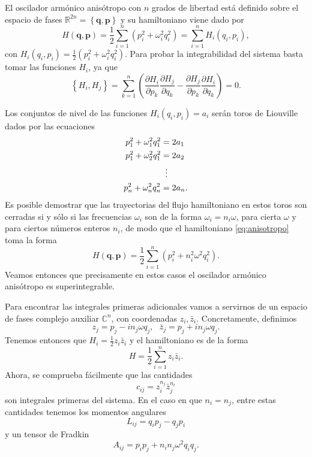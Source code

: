 \documentclass[11pt,a4paper,twoside]{article}
\theoremstyle{definition} \newtheorem{defn}[thm]{Definición}
\theoremstyle{definition} \newtheorem{ejemplo}[thm]{Ejemplo}
\theoremstyle{definition} \newtheorem{ejercicio}[thm]{Ejercicio}
\theoremstyle{remark} \newtheorem*{obs}{Observación}
\def\CC{\mathbb{C}}
\def\RR{\mathbb{R}}
\newcommand{\vect}[1]{\mathbf{#1}}
\newcommand{\parcial}[2]{\frac{\partial #1}{\partial #2}}
\begin{document}
El oscilador armónico anisótropo con $n$ grados de libertad está definido sobre el espacio de fases $\RR^{2n}=\left\{ \vect{q},\vect{p} \right\}$ y su hamiltoniano viene dado por
\begin{equation}
  H(\vect{q},\vect{p})=\frac{1}{2}\sum_{i=1}^n \left(p_i^2 + \omega_i^2q_i^2\right)=\sum_{i=1}^n H_i(q_i,p_i),
  \label{eq:anisotropo}
\end{equation}
con $H_i(q_i,p_i)=\frac{1}{2}(p_i^2+\omega_i^2q_i^2)$. Para probar la integrabilidad del sistema basta tomar las funciones $H_i$, ya que
\begin{equation*}
  \left\{ H_i,H_j \right\}=\sum_{k=1}^n\left(\parcial{H_i}{p_k}\parcial{H_j}{q_k}-\parcial{H_j}{p_k}\parcial{H_i}{q_k}\right)=0.
\end{equation*}

Los conjuntos de nivel de las funciones $H_i(q_i,p_i)=a_i$ serán toros de Liouville dados por las ecuaciones
\begin{align*}[left=\empheqlbrace]
    p_1^2+\omega_1^2q_1^2&= 2a_1\\
    p_1^2+\omega_2^2q_1^2&= 2a_2\\
    &\vdotswithin{=} \\
    p_n^2+\omega_n^2q_n^2&= 2a_n.
\end{align*}
Es posible demostrar que las trayectorias del flujo hamiltoniano en estos toros son cerradas si y sólo si las frecuencias $\omega_i$ son de la forma $\omega_i=n_i \omega$, para cierta $\omega$ y para ciertos números enteros $n_i$, de modo que el hamiltoniano \eqref{eq:anisotropo} toma la forma
\begin{equation}
  H(\vect{q},\vect{p})=\frac{1}{2}\sum_{i=1}^n \left(p_i^2 + n_i^2\omega^2q_i^2\right).
\end{equation}
Veamos entonces que precisamente en estos casos el oscilador armónico anisótropo es superintegrable.

Para encontrar las integrales primeras adicionales vamos a servirnos de un espacio de fases complejo auxiliar $\CC^n$, con coordenadas $z_i, \bar{z}_i$. Concretamente, definimos
\begin{equation}
  z_j=p_j-in_j\omega q_j,\ \ \  \bar{z}_j=p_j+in_j\omega q_j.  
\end{equation}
Tenemos entonces que $H_i=\frac{1}{2}z_i\bar{z}_i$ y el hamiltoniano es de la forma
\begin{equation}
  H=\frac{1}{2}\sum_{i=1}^n z_i\bar{z}_i. 
\end{equation}
Ahora, se comprueba fácilmente que las cantidades
\begin{equation}
  c_{ij}=z_i^{n_j}\bar{z}_j^{n_i} 
\end{equation}
son integrales primeras del sistema. En el caso en que $n_i=n_j$, entre estas cantidades tenemos los momentos angulares
\begin{equation}
  L_{ij}=q_ip_j-q_jp_i 
\end{equation}
y un tensor de Fradkin
\begin{equation}
  A_{ij}=p_ip_j+n_in_j\omega^2 q_iq_j. 
\end{equation}
\end{document}
